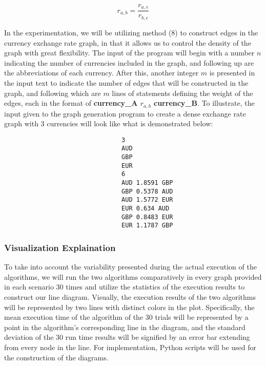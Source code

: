 \documentclass[12pt]{article}
\begin{document}
\begin{equation}
r_{a,b} = \frac{r_{a,e}}{r_{b,e}}
\end{equation}

\boldmath %
In the experimentation, we will be utilizing method (8) to construct edges in the currency exchange rate graph, in that it allows us to control the density of the graph with great flexibility. The input of the program will begin with a number $n$ indicating the number of currencies included in the graph, and following up are the abbreviations of each currency. After this, another integer $m$ is presented in the input text to indicate the number of edges that will be constructed in the graph, and following which are $m$ lines of statements defining the weight of the edges, each in the format of \textbf{currency\_A $r_{a, b}$ currency\_B}. To illustrate, the input given to the graph generation program to create a dense exchange rate graph with 3 currencies will look like what is demonstrated below:
\unboldmath %

\begin{verbatim}
                                3
                                AUD
                                GBP
                                EUR
                                6
                                AUD 1.8591 GBP
                                GBP 0.5378 AUD
                                AUD 1.5772 EUR
                                EUR 0.634 AUD
                                GBP 0.8483 EUR
                                EUR 1.1787 GBP
\end{verbatim}

\subsubsection{Visualization Explaination}

To take into account the variability presented during the actual execution of the algorithms, we will run the two algorithms comparatively in every graph provided in each scenario 30 times and utilize the statistics of the execution results to construct our line diagram. Visually, the execution results of the two algorithms will be represented by two lines with distinct colors in the plot. Specifically, the mean execution time of the algorithm of the 30 trials will be represented by a point in the algorithm's corresponding line in the diagram, and the standard deviation of the 30 run time results will be signified by an error bar extending from every node in the line. For implementation, Python scripts will be used for the construction of the diagrams.
\end{document}
